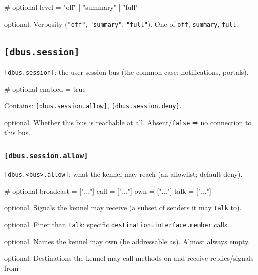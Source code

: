 \begin{kennelcode}
# optional
level    = "off" | "summary" | "full"
\end{kennelcode}

\begin{description}
\tightlist
\item[\texttt{level}]
optional. Verbosity (\texttt{"off"}, \texttt{"summary"},
\texttt{"full"}). One of \texttt{off}, \texttt{summary}, \texttt{full}.
\end{description}

\hypertarget{dbus.session}{%
\subsection{\texorpdfstring{\texttt{{[}dbus.session{]}}}{{[}dbus.session{]}}}\label{dbus.session}}

\texttt{{[}dbus.session{]}}: the user session bus (the common case:
notifications, portals).

\begin{kennelcode}
# optional
enabled  = true
\end{kennelcode}

Contains: \texttt{{[}dbus.session.allow{]}},
\texttt{{[}dbus.session.deny{]}}.

\begin{description}
\tightlist
\item[\texttt{enabled}]
optional. Whether this bus is reachable at all. Absent/\texttt{false} ⇒
no connection to this bus.
\end{description}

\hypertarget{dbus.session.allow}{%
\subsubsection{\texorpdfstring{\texttt{{[}dbus.session.allow{]}}}{{[}dbus.session.allow{]}}}\label{dbus.session.allow}}

\texttt{{[}dbus.\textless{}bus\textgreater{}.allow{]}}: what the kennel
may reach (an allowlist; default-deny).

\begin{kennelcode}
# optional
broadcast = ["..."]
call     = ["..."]
own      = ["..."]
talk     = ["..."]
\end{kennelcode}

\begin{description}
\tightlist
\item[\texttt{broadcast}]
optional. Signals the kennel may receive (a subset of senders it may
\texttt{talk} to).
\item[\texttt{call}]
optional. Finer than \texttt{talk}: specific
\texttt{destination=interface.member} calls.
\item[\texttt{own}]
optional. Names the kennel may own (be addressable as). Almost always
empty.
\item[\texttt{talk}]
optional. Destinations the kennel may call methods on and receive
replies/signals from
\end{description}

